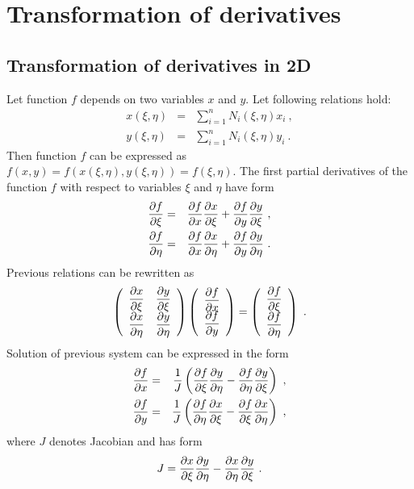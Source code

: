 \section{Transformation of derivatives}

\subsection{Transformation of derivatives in 2D}

Let function $f$ depends on two variables $x$ and $y$. Let following
relations hold:
\begin{eqnarray}
x(\xi,\eta) &=& \sum_{i=1}^{n} N_i(\xi,\eta) x_i\ ,
\\
y(\xi,\eta) &=& \sum_{i=1}^{n} N_i(\xi,\eta) y_i\ .
\end{eqnarray}
Then function $f$ can be expressed as $f(x,y)=f(x(\xi,\eta),y(\xi,\eta))=f(\xi,\eta)$. The first partial
derivatives of the function $f$ with respect to variables $\xi$ and $\eta$ have form
\begin{eqnarray}
\ppd{f}{\xi} &=& \ppd{f}{x}\ppd{x}{\xi} + \ppd{f}{y}\ppd{y}{\xi}\ ,
\\
\ppd{f}{\eta} &=& \ppd{f}{x}\ppd{x}{\eta} + \ppd{f}{y}\ppd{y}{\eta}\ .
\end{eqnarray}
Previous relations can be rewritten as
\begin{equation}
\left(\begin{array}{cc}
\ppd{x}{\xi} & \ppd{y}{\xi}
\\
\ppd{x}{\eta} & \ppd{y}{\eta}
\end{array}\right)
\left(\begin{array}{c}
\ppd{f}{x}
\\
\ppd{f}{y}
\end{array}\right)
=
\left(\begin{array}{c}
\ppd{f}{\xi}
\\
\ppd{f}{\eta}
\end{array}\right)\ .
\end{equation}
Solution of previous system can be expressed in the form
\begin{eqnarray}
\ppd{f}{x} &=& \del{1}{J}\left(\ppd{f}{\xi}\ppd{y}{\eta} - \ppd{f}{\eta}\ppd{y}{\xi}\right)\ ,
\\
\ppd{f}{y} &=& \del{1}{J}\left(\ppd{f}{\eta}\ppd{x}{\xi} - \ppd{f}{\xi}\ppd{x}{\eta}\right)\ ,
\end{eqnarray}
where $J$ denotes Jacobian and has form
\begin{equation}
J = \ppd{x}{\xi}\ppd{y}{\eta} - \ppd{x}{\eta}\ppd{y}{\xi}\ .
\end{equation}
